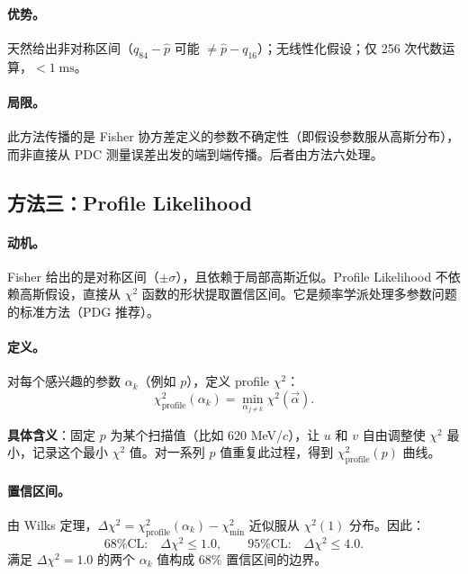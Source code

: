 \documentclass[a4paper, 11pt]{article}
\begin{document}
\paragraph{优势。}
天然给出非对称区间（$q_{84} - \hat{p}$ 可能 $\neq \hat{p} - q_{16}$）；无线性化假设；仅 256 次代数运算，$< 1\;\mathrm{ms}$。

\paragraph{局限。}
此方法传播的是 Fisher 协方差定义的参数不确定性（即假设参数服从高斯分布），而非直接从 PDC 测量误差出发的端到端传播。后者由方法六处理。

\subsection{方法三：Profile Likelihood}
\label{sec:profile}

\paragraph{动机。}
Fisher 给出的是对称区间（$\pm \sigma$），且依赖于局部高斯近似。Profile Likelihood 不依赖高斯假设，直接从 $\chi^2$ 函数的形状提取置信区间。它是频率学派处理多参数问题的标准方法（PDG 推荐）。

\paragraph{定义。}
对每个感兴趣的参数 $\alpha_k$（例如 $p$），定义 profile $\chi^2$：
\begin{equation}
  \chi^2_\mathrm{profile}(\alpha_k) = \min_{\alpha_{j \neq k}} \chi^2(\vec{\alpha}).
  \label{eq:profile}
\end{equation}

\textbf{具体含义}：固定 $p$ 为某个扫描值（比如 620 MeV/$c$），让 $u$ 和 $v$ 自由调整使 $\chi^2$ 最小，记录这个最小 $\chi^2$ 值。对一系列 $p$ 值重复此过程，得到 $\chi^2_\mathrm{profile}(p)$ 曲线。

\paragraph{置信区间。}
由 Wilks 定理，$\Delta\chi^2 = \chi^2_\mathrm{profile}(\alpha_k) - \chi^2_\mathrm{min}$ 近似服从 $\chi^2(1)$ 分布。因此：
\begin{equation}
  \text{68\% CL:}\quad \Delta\chi^2 \leq 1.0, \qquad
  \text{95\% CL:}\quad \Delta\chi^2 \leq 4.0.
\end{equation}
满足 $\Delta\chi^2 = 1.0$ 的两个 $\alpha_k$ 值构成 68\% 置信区间的边界。
\end{document}
